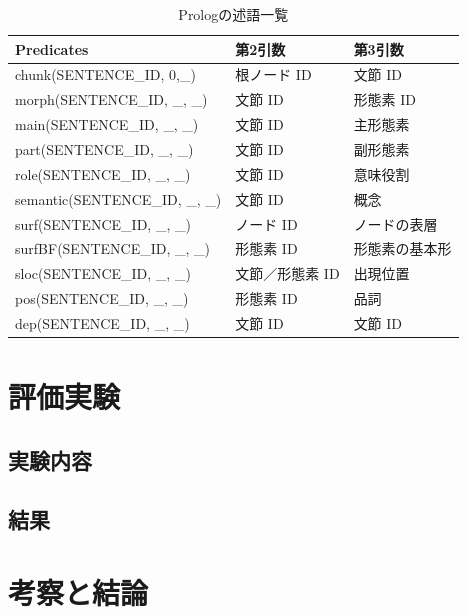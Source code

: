 \documentclass{FITpaper}
\begin{document}
\begin{table}[htbp]
  \caption{Prologの述語一覧}
  {\small
  \begin{center}
    \begin{tabular}{|l||l|l|}\hline
      Predicates                         &  第2引数   & 第3引数               \\
      \hline 

      chunk(SENTENCE\_ID, 0,\_)           &  根ノード ID& 文節 ID                   \\
      morph(SENTENCE\_ID, \_, \_)      & 文節 ID& 形態素 ID                \\
      main(SENTENCE\_ID, \_, \_)         &文節 ID & 主形態素 \\
      part(SENTENCE\_ID, \_, \_)         &文節 ID& 副形態素\\
      role(SENTENCE\_ID, \_, \_)         &文節 ID& 意味役割  \\
      semantic(SENTENCE\_ID, \_, \_)     &文節 ID & 概念\\
      surf(SENTENCE\_ID, \_, \_)          &ノード ID& ノードの表層\\               
      surfBF(SENTENCE\_ID, \_, \_)       &形態素 ID& 形態素の基本形        \\
      sloc(SENTENCE\_ID, \_, \_)&文節／形態素 ID & 出現位置\\
      pos(SENTENCE\_ID, \_, \_)          &形態素 ID& 品詞\\                                        
      dep(SENTENCE\_ID, \_, \_)        &文節 ID & 文節 ID\\
        \hline
    \end{tabular}
  
    \label{tbl:predicates}
  \end{center}
  }
\end{table}
\section{評価実験}

\subsection{実験内容}
\subsection{結果}
\section{考察と結論}


%

%
\end{document}
